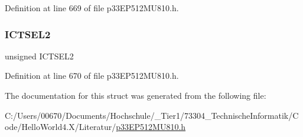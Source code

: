 Definition at line 669 of file p33\+E\+P512\+M\+U810.\+h.

\mbox{\label{structtag_i_c3_c_o_n1_b_i_t_s_a47d80892d449e6edbd5ba2ba9ff06deb}} 
\subsubsection{\texorpdfstring{I\+C\+T\+S\+E\+L2}{ICTSEL2}}
{\footnotesize\ttfamily unsigned I\+C\+T\+S\+E\+L2}



Definition at line 670 of file p33\+E\+P512\+M\+U810.\+h.



The documentation for this struct was generated from the following file\+:\begin{DoxyCompactItemize}
\item 
C\+:/\+Users/00670/\+Documents/\+Hochschule/\+\_\+\+Tier1/73304\+\_\+\+Technische\+Informatik/\+Code/\+Hello\+World4.\+X/\+Literatur/\hyperlink{p33_e_p512_m_u810_8h}{p33\+E\+P512\+M\+U810.\+h}\end{DoxyCompactItemize}
